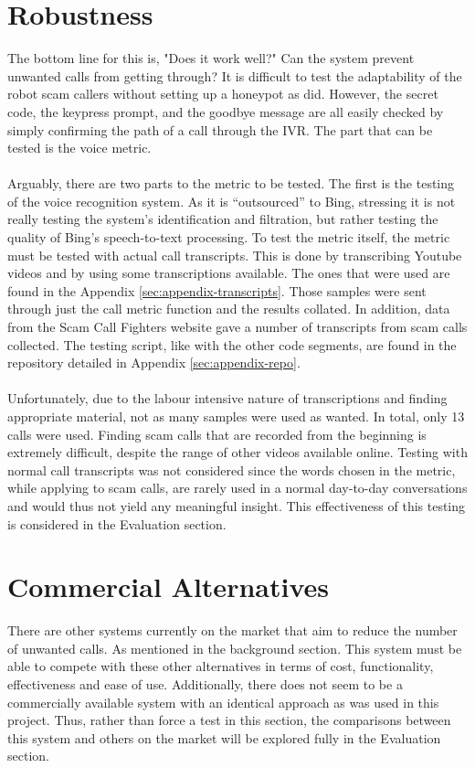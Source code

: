 \documentclass[main.tex]{subfiles}
\begin{document}
\section{Robustness}
The bottom line for this is, "Does it work well?" Can the system prevent unwanted calls from getting through? It is difficult to test the adaptability of the robot scam callers without setting up a honeypot as  did. However, the secret code, the keypress prompt, and the goodbye message are all easily checked by simply confirming the path of a call through the IVR. The part that can be tested is the voice metric.
\\\\
Arguably, there are two parts to the metric to be tested. The first is the testing of the voice recognition system. As it is ``outsourced'' to Bing, stressing it is not really testing the system's identification and filtration, but rather testing the quality of Bing's speech-to-text processing. To test the metric itself, the metric must be tested with actual call transcripts. This is done by transcribing Youtube videos and by using some transcriptions available. The ones that were used are found in the Appendix \ref{sec:appendix-transcripts}. Those samples were sent through just the call metric function and the results collated. In addition, data from the Scam Call Fighters website \cite{spam-calls} gave a number of transcripts from scam calls collected. The testing script, like with the other code segments, are found in the repository detailed in Appendix \ref{sec:appendix-repo}. 
\\\\
Unfortunately, due to the labour intensive nature of transcriptions and finding appropriate material, not as many samples were used as wanted. In total, only 13 calls were used. Finding scam calls that are recorded from the beginning is extremely difficult, despite the range of other videos available online. Testing with normal call transcripts was not considered since the words chosen in the metric, while applying to scam calls, are rarely used in a normal day-to-day conversations and would thus not yield any meaningful insight. This effectiveness of this testing is considered in the Evaluation section.

\section{Commercial Alternatives}
There are other systems currently on the market that aim to reduce the number of unwanted calls. As mentioned in the background section. This system must be able to compete with these other alternatives in terms of cost, functionality, effectiveness and ease of use. Additionally, there does not seem to be a commercially available system with an identical approach as was used in this project. Thus, rather than force a test in this section, the comparisons between this system and others on the market will be explored fully in the Evaluation section.
\end{document}
